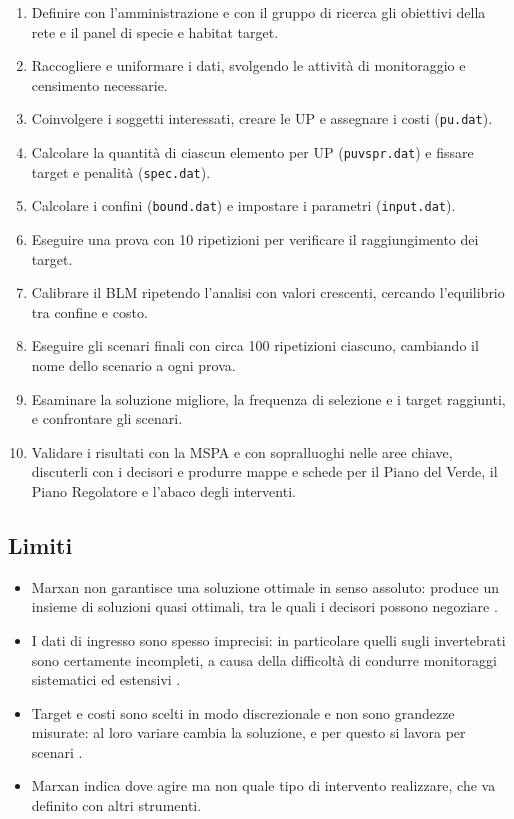 \documentclass[
  a4paper,
]{book}
\providecommand{\tightlist}{%
  \setlength{\itemsep}{0pt}\setlength{\parskip}{0pt}}
\begin{document}
\begin{enumerate}
\def\labelenumi{\arabic{enumi}.}
\tightlist
\item
  Definire con l'amministrazione e con il gruppo di ricerca gli obiettivi della rete e il panel di specie e habitat target.
\item
  Raccogliere e uniformare i dati, svolgendo le attività di monitoraggio e censimento necessarie.
\item
  Coinvolgere i soggetti interessati, creare le UP e assegnare i costi (\texttt{pu.dat}).
\item
  Calcolare la quantità di ciascun elemento per UP (\texttt{puvspr.dat}) e fissare target e penalità (\texttt{spec.dat}).
\item
  Calcolare i confini (\texttt{bound.dat}) e impostare i parametri (\texttt{input.dat}).
\item
  Eseguire una prova con 10 ripetizioni per verificare il raggiungimento dei target.
\item
  Calibrare il BLM ripetendo l'analisi con valori crescenti, cercando l'equilibrio tra confine e costo.
\item
  Eseguire gli scenari finali con circa 100 ripetizioni ciascuno, cambiando il nome dello scenario a ogni prova.
\item
  Esaminare la soluzione migliore, la frequenza di selezione e i target raggiunti, e confrontare gli scenari.
\item
  Validare i risultati con la MSPA e con sopralluoghi nelle aree chiave, discuterli con i decisori e produrre mappe e schede per il Piano del Verde, il Piano Regolatore e l'abaco degli interventi.
\end{enumerate}

\subsection{Limiti}\label{limiti}

\begin{itemize}
\tightlist
\item
  Marxan non garantisce una soluzione ottimale in senso assoluto: produce un insieme di soluzioni quasi ottimali, tra le quali i decisori possono negoziare \citep{game2013}.
\item
  I dati di ingresso sono spesso imprecisi: in particolare quelli sugli invertebrati sono certamente incompleti, a causa della difficoltà di condurre monitoraggi sistematici ed estensivi \citep{ardron2010}.
\item
  Target e costi sono scelti in modo discrezionale e non sono grandezze misurate: al loro variare cambia la soluzione, e per questo si lavora per scenari \citep{daigle2020, game2013}.
\item
  Marxan indica dove agire ma non quale tipo di intervento realizzare, che va definito con altri strumenti.
\end{itemize}
\end{document}
